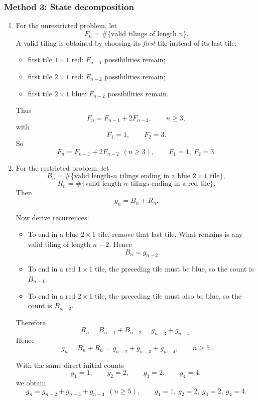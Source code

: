 \documentclass[12pt]{article}
\begin{document}
\subsubsection*{Method 3: State decomposition}
\begin{enumerate}[label=(\alph*)]
\item For the unrestricted problem, let
\[
F_n=\#\{\text{valid tilings of length }n\}.
\]
A valid tiling is obtained by choosing its \emph{first} tile instead of its last tile:
\begin{itemize}[leftmargin=*]
  \item first tile \(1\times 1\) red: \(F_{n-1}\) possibilities remain;
  \item first tile \(2\times 1\) red: \(F_{n-2}\) possibilities remain;
  \item first tile \(2\times 1\) blue: \(F_{n-2}\) possibilities remain.
\end{itemize}
Thus
\[
F_n=F_{n-1}+2F_{n-2}, \qquad n\ge 3,
\]
with
\[
F_1=1,\qquad F_2=3.
\]
So
\[
\boxed{F_n=F_{n-1}+2F_{n-2}\ \ (n\ge 3), \qquad F_1=1,\ F_2=3.}
\]

\item For the restricted problem, let
\[
B_n=\#\{\text{valid length-}n\text{ tilings ending in a blue }2\times 1\text{ tile}\},
\]
\[
R_n=\#\{\text{valid length-}n\text{ tilings ending in a red tile}\}.
\]
Then
\[
g_n=B_n+R_n.
\]

Now derive recurrences:
\begin{itemize}[leftmargin=*]
  \item To end in a blue \(2\times 1\) tile, remove that last tile. What remains is any valid tiling of length \(n-2\). Hence
  \[
  B_n=g_{n-2}.
  \]
  \item To end in a red \(1\times 1\) tile, the preceding tile must be blue, so the count is \(B_{n-1}\).
  \item To end in a red \(2\times 1\) tile, the preceding tile must also be blue, so the count is \(B_{n-2}\).
\end{itemize}
Therefore
\[
R_n=B_{n-1}+B_{n-2}=g_{n-3}+g_{n-4}.
\]
Hence
\[
g_n=B_n+R_n=g_{n-2}+g_{n-3}+g_{n-4}, \qquad n\ge 5.
\]

With the same direct initial counts
\[
g_1=1,\qquad g_2=2,\qquad g_3=2,\qquad g_4=4,
\]
we obtain
\[
\boxed{g_n=g_{n-2}+g_{n-3}+g_{n-4}\ \ (n\ge 5), \qquad g_1=1,\ g_2=2,\ g_3=2,\ g_4=4.}
\]
\end{enumerate}

\newpage

\end{document}
